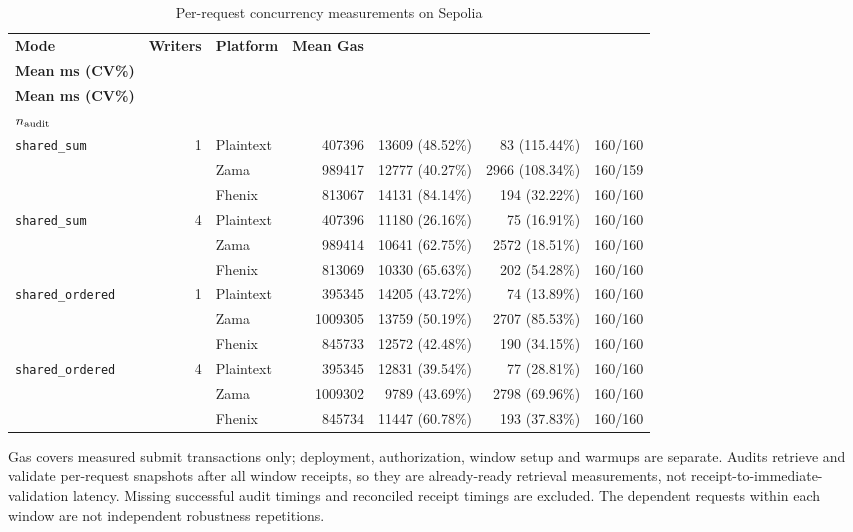 \begin{table}[!t]
\caption{Per-request concurrency measurements on Sepolia}
\label{tab:concurrency-request-performance}
\centering
\scriptsize
\setlength{\tabcolsep}{3pt}
\begin{tabular}{|l|r|l|r|r|r|r|}
\hline
\textbf{Mode} & \textbf{Writers} & \textbf{Platform} & \textbf{Mean Gas} & \shortstack{\textbf{Tx to receipt}\\\textbf{Mean ms (CV\%)}} & \shortstack{\textbf{Deferred audit}\\\textbf{Mean ms (CV\%)}} & \shortstack{\textbf{$n_{\rm receipt}$ /}\\\textbf{$n_{\rm audit}$}} \\
\hline
\texttt{shared\_sum} & 1 & Plaintext & 407396 & 13609 (48.52\%) & 83 (115.44\%) & 160/160 \\
 &  & Zama & 989417 & 12777 (40.27\%) & 2966 (108.34\%) & 160/159 \\
 &  & Fhenix & 813067 & 14131 (84.14\%) & 194 (32.22\%) & 160/160 \\
\hline
\texttt{shared\_sum} & 4 & Plaintext & 407396 & 11180 (26.16\%) & 75 (16.91\%) & 160/160 \\
 &  & Zama & 989414 & 10641 (62.75\%) & 2572 (18.51\%) & 160/160 \\
 &  & Fhenix & 813069 & 10330 (65.63\%) & 202 (54.28\%) & 160/160 \\
\hline
\texttt{shared\_ordered} & 1 & Plaintext & 395345 & 14205 (43.72\%) & 74 (13.89\%) & 160/160 \\
 &  & Zama & 1009305 & 13759 (50.19\%) & 2707 (85.53\%) & 160/160 \\
 &  & Fhenix & 845733 & 12572 (42.48\%) & 190 (34.15\%) & 160/160 \\
\hline
\texttt{shared\_ordered} & 4 & Plaintext & 395345 & 12831 (39.54\%) & 77 (28.81\%) & 160/160 \\
 &  & Zama & 1009302 & 9789 (43.69\%) & 2798 (69.96\%) & 160/160 \\
 &  & Fhenix & 845734 & 11447 (60.78\%) & 193 (37.83\%) & 160/160 \\
\hline
\end{tabular}
\par\smallskip
\begin{minipage}{\textwidth}\scriptsize Gas covers measured submit transactions only; deployment, authorization, window setup and warmups are separate. Audits retrieve and validate per-request snapshots after all window receipts, so they are already-ready retrieval measurements, not receipt-to-immediate-validation latency. Missing successful audit timings and reconciled receipt timings are excluded. The dependent requests within each window are not independent robustness repetitions.\end{minipage}
\end{table}

